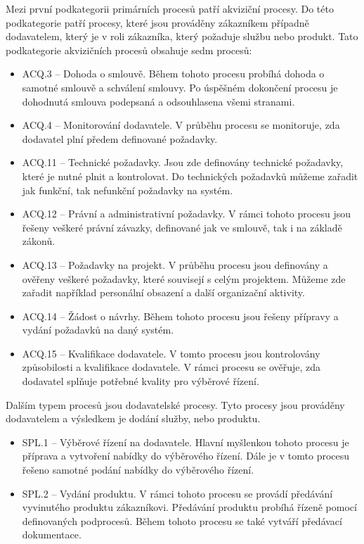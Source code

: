 \documentclass[czech,master,public,dept460,male,cpdeclaration,oneside]{diploma}
\begin{document}
Mezi první podkategorii primárních procesů patří akviziční procesy. Do této podkategorie patří procesy, které jsou prováděny zákazníkem případně dodavatelem, který je v roli zákazníka, který požaduje  službu nebo produkt. Tato podkategorie akvizičních procesů obsahuje sedm procesů:

\begin{itemize}
	\item ACQ.3 -- Dohoda o smlouvě. Během tohoto procesu probíhá dohoda o samotné smlouvě a schválení smlouvy. Po úspěšném dokončení procesu je dohodnutá smlouva podepsaná a odsouhlasena všemi stranami.
	\item ACQ.4 -- Monitorování dodavatele. V průběhu procesu se monitoruje, zda dodavatel plní předem definované požadavky.
	\item ACQ.11 -- Technické požadavky. Jsou zde definovány technické požadavky, které je nutné plnit a kontrolovat. Do technických požadavků můžeme zařadit jak funkční, tak nefunkční požadavky na systém.
	\item ACQ.12 -- Právní a administrativní požadavky. V rámci tohoto procesu jsou řešeny veškeré právní závazky, definované jak ve smlouvě, tak i  na základě zákonů.
	\item ACQ.13 -- Požadavky na projekt. V průběhu procesu jsou definovány a ověřeny veškeré požadavky, které souvisejí s celým projektem. Můžeme zde zařadit například personální obsazení a další organizační aktivity.
	\item ACQ.14 -- Žádost o návrhy.  Během tohoto procesu jsou řešeny přípravy a vydání požadavků na daný systém.
	\item ACQ.15 -- Kvalifikace dodavatele. V tomto procesu jsou kontrolovány způsobilosti a kvalifikace dodavatele. V rámci procesu se ověřuje, zda dodavatel splňuje potřebné kvality pro výběrové řízení.
\end{itemize}

Dalším typem procesů jsou dodavatelské procesy. Tyto procesy jsou prováděny dodavatelem a výsledkem je dodání služby, nebo produktu.

\begin{itemize}
	\item SPL.1 -- Výběrové řízení na dodavatele. Hlavní myšlenkou tohoto procesu je příprava a vytvoření nabídky do výběrového řízení.  Dále je v tomto procesu řešeno samotné podání nabídky do výběrového řízení.
	\item SPL.2 -- Vydání produktu. V rámci tohoto procesu se provádí předávání vyvinutého produktu zákazníkovi. Předávání produktu probíhá řízeně pomocí definovaných podprocesů. Během tohoto procesu se také vytváří předávací dokumentace. 
\end{itemize}	
\end{document}
